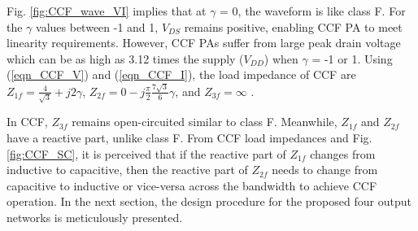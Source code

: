 \documentclass[conference]{IEEEtran}
\begin{document}
Fig. \ref{fig:CCF_wave_VI} implies that at $\gamma$ = 0, the waveform is like class F. For the $\gamma$ values between -1 and 1, $V_{DS}$ remains positive, enabling CCF PA to meet linearity requirements. However, CCF PAs suffer from large peak drain voltage which can be as high as 3.12 times the supply ($V_{DD}$) when $\gamma$ = -1 or 1. Using (\ref{eqn_CCF_V}) and (\ref{eqn_CCF_I}), the load impedance of CCF  are $Z_{1f}=\frac{4}{\sqrt{3}}+j 2 \gamma$, $Z_{2f}=0-j \frac{\pi}{2} \frac{7 \sqrt{3}}{6} \gamma$, and $Z_{3f}=\infty$ \cite{CCFDesign_ali}.


In CCF, $Z_{3f}$ remains open-circuited similar to class F. Meanwhile, $Z_{1f}$ and $Z_{2f}$ have a reactive part, unlike class F. From CCF load impedances and Fig. \ref{fig:CCF_SC}, it is perceived that if the reactive part of $Z_{1f}$ changes from inductive to capacitive, then the reactive part of $Z_{2f}$  needs to change from capacitive to inductive or vice-versa across the bandwidth to achieve CCF operation. In the next section, the design procedure for the proposed four output networks is meticulously presented. 
\end{document}

